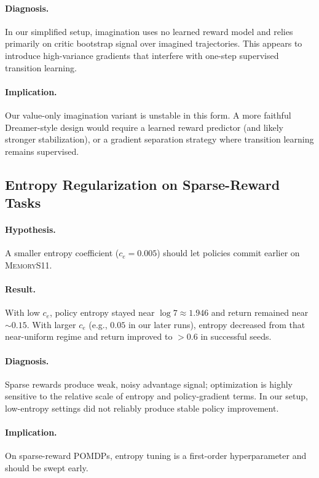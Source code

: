 \paragraph{Diagnosis.}
In our simplified setup, imagination uses no learned reward model and relies primarily on critic bootstrap signal over imagined trajectories. This appears to introduce high-variance gradients that interfere with one-step supervised transition learning.

\paragraph{Implication.}
Our value-only imagination variant is unstable in this form. A more faithful Dreamer-style design would require a learned reward predictor (and likely stronger stabilization), or a gradient separation strategy where transition learning remains supervised.

\subsection{Entropy Regularization on Sparse-Reward Tasks}

\paragraph{Hypothesis.}
A smaller entropy coefficient ($c_e=0.005$) should let policies commit earlier on \textsc{MemoryS11}.

\paragraph{Result.}
With low $c_e$, policy entropy stayed near $\log 7 \approx 1.946$ and return remained near $\sim 0.15$. With larger $c_e$ (e.g., $0.05$ in our later runs), entropy decreased from that near-uniform regime and return improved to $>0.6$ in successful seeds.

\paragraph{Diagnosis.}
Sparse rewards produce weak, noisy advantage signal; optimization is highly sensitive to the relative scale of entropy and policy-gradient terms. In our setup, low-entropy settings did not reliably produce stable policy improvement.

\paragraph{Implication.}
On sparse-reward POMDPs, entropy tuning is a first-order hyperparameter and should be swept early.


